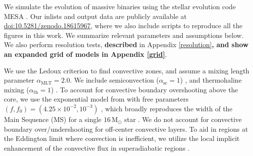 \documentclass[linenumbers,trackchanges,twocolumn]{aastex701}
\newcommand{\Mdot}{\mathrm{M}_{\odot}}
\begin{document}
We simulate the evolution of massive binaries using the stellar
evolution code \textsc{MESA}
\citep[][\texttt{r24.08.01}]{2011ApJS..192....3P,2013ApJS..208....4P,2015ApJS..220...15P,2018ApJS..234...34P,2019ApJS..243...10P,2023ApJS..265...15J}. Our inlists and output data are publicly available at \href{https://doi.org/10.5281/zenodo.18615967}{doi:10.5281/zenodo.18615967}, where we also include scripts to reproduce all the figures in this work. We summarize relevant parameters and assumptions below. We also perform resolution tests, \textbf{described} in Appendix \ref{resolution}\textbf{, and show an expanded grid of models in Appendix \ref{grid}}.

We use the Ledoux criterion \citep{1947ApJ...105..305L} to find
convective zones, and assume a mixing length parameter
$\alpha_{\mathrm{MLT}}=2.0$. We include semiconvection
($\alpha_{\mathrm{sc}}=1$) \citep{1983A&A...126..207L}, and
thermohaline mixing ($\alpha_{\mathrm{th}}=1$)
\citep{1980A&A....91..175K}. To account for convective boundary overshooting above the core, we use the exponential model from \cite{2000A&A...360..952H} with free parameters $(f,f_0) = (4.25 \times 10^{-2}, 10^{-3})$ \citep{2018ApJ...859..100C}, which broadly reproduces the width of the Main Sequence (MS) for a single $16 \, \Mdot$ star \citep{2011A&A...530A.115B}. We do not account for convective boundary over/undershooting for off-center convective layers. To aid in regions at the Eddington limit where convection is inefficient, we utilize the local implicit enhancement of the convective flux in superadiabatic regions \citep[\texttt{use\_superad\_reduction} from][]{2023ApJS..265...15J}.
\end{document}
